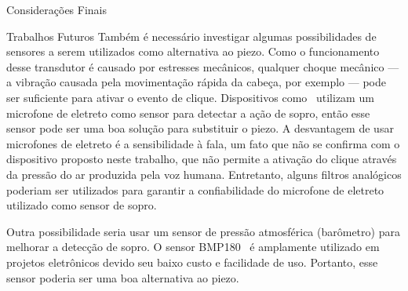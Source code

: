 \begin{chapter}{Considerações Finais}
\begin{section}{Trabalhos Futuros}
Também é necessário investigar algumas possibilidades de sensores a serem
utilizados como alternativa ao piezo. Como o funcionamento desse transdutor é
causado por estresses mecânicos, qualquer choque mecânico --- a vibração causada
pela movimentação rápida da cabeça, por exemplo --- pode ser suficiente para
ativar o evento de clique. Dispositivos como~\cite{Sip} utilizam  um microfone
de eletreto como sensor para detectar a ação de sopro, então esse sensor pode
ser uma boa solução para substituir o piezo. A desvantagem de usar microfones de
eletreto é a sensibilidade à fala, um fato que não se confirma com o
dispositivo proposto neste trabalho, que não permite a ativação do clique através
da pressão do ar produzida pela voz humana. Entretanto, alguns filtros analógicos
poderiam ser utilizados para garantir a confiabilidade do microfone de eletreto
utilizado como sensor de sopro. 

Outra possibilidade seria usar um sensor de pressão atmosférica (barômetro) para
melhorar a detecção de sopro. O sensor BMP180~\cite{bmp180} é amplamente
utilizado em projetos eletrônicos devido seu baixo custo e facilidade de uso.
Portanto, esse sensor poderia ser uma boa alternativa ao piezo.


\end{section}

\end{chapter}
